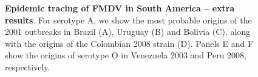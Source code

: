 \documentclass[a4paper,10pt]{article}
\begin{document}
\begin{center}
\begin{figure}[H]
\begin{center}
\end{center}
\caption{\textbf{Epidemic tracing of FMDV in South America -- extra results}.
For serotype A, we show the most probable origins of the 2001 outbreaks in Brazil (A), Uruguay (B) and Bolivia (C), along with the origins of the Colombian 2008 strain (D).
Panels E and F show the origins of serotype O in Venezuela 2003 and Peru 2008, respectively.
}
\label{sfig:epitrac}
\end{figure}
\end{center}
\end{document}
